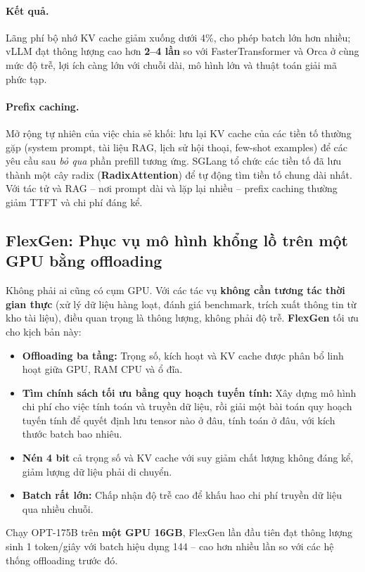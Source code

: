 \paragraph{Kết quả.} Lãng phí bộ nhớ KV cache giảm xuống dưới 4\%, cho phép batch lớn hơn nhiều; vLLM đạt thông lượng cao hơn \textbf{2--4 lần} so với FasterTransformer và Orca ở cùng mức độ trễ, lợi ích càng lớn với chuỗi dài, mô hình lớn và thuật toán giải mã phức tạp.

\paragraph{Prefix caching.} Mở rộng tự nhiên của việc chia sẻ khối: lưu lại KV cache của các tiền tố thường gặp (system prompt, tài liệu RAG, lịch sử hội thoại, few-shot examples) để các yêu cầu sau \emph{bỏ qua} phần prefill tương ứng. SGLang \cite{zheng2024sglang} tổ chức các tiền tố đã lưu thành một cây radix (\textbf{RadixAttention}) để tự động tìm tiền tố chung dài nhất. Với tác tử và RAG -- nơi prompt dài và lặp lại nhiều -- prefix caching thường giảm TTFT và chi phí đáng kể.

\subsection{FlexGen: Phục vụ mô hình khổng lồ trên một GPU bằng offloading}
\label{ssec:flexgen}
Không phải ai cũng có cụm GPU. Với các tác vụ \textbf{không cần tương tác thời gian thực} (xử lý dữ liệu hàng loạt, đánh giá benchmark, trích xuất thông tin từ kho tài liệu), điều quan trọng là thông lượng, không phải độ trễ. \textbf{FlexGen} \cite{sheng2023flexgen} tối ưu cho kịch bản này:
\begin{itemize}
	\item \textbf{Offloading ba tầng:} Trọng số, kích hoạt và KV cache được phân bổ linh hoạt giữa GPU, RAM CPU và ổ đĩa.
	\item \textbf{Tìm chính sách tối ưu bằng quy hoạch tuyến tính:} Xây dựng mô hình chi phí cho việc tính toán và truyền dữ liệu, rồi giải một bài toán quy hoạch tuyến tính để quyết định lưu tensor nào ở đâu, tính toán ở đâu, với kích thước batch bao nhiêu.
	\item \textbf{Nén 4 bit} cả trọng số và KV cache với suy giảm chất lượng không đáng kể, giảm lượng dữ liệu phải di chuyển.
	\item \textbf{Batch rất lớn:} Chấp nhận độ trễ cao để khấu hao chi phí truyền dữ liệu qua nhiều chuỗi.
\end{itemize}
Chạy OPT-175B trên \textbf{một GPU 16GB}, FlexGen lần đầu tiên đạt thông lượng sinh 1 token/giây với batch hiệu dụng 144 -- cao hơn nhiều lần so với các hệ thống offloading trước đó.
